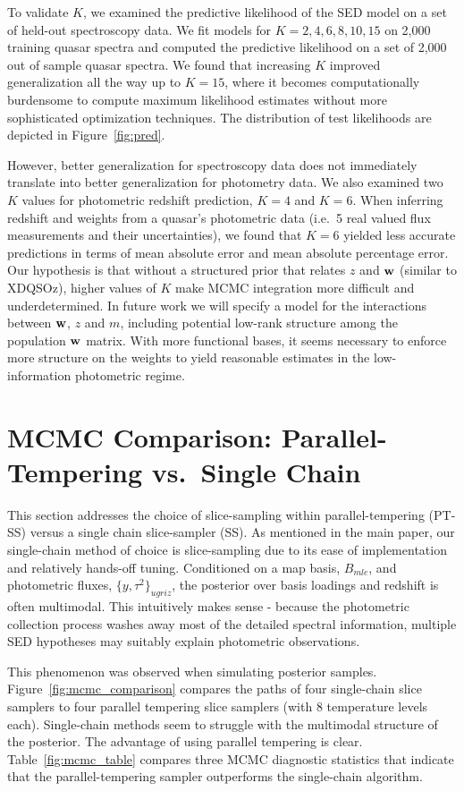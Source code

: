 \documentclass{article} %
\begin{document}
To validate $K$, we examined the predictive likelihood of the SED model on a set of held-out spectroscopy data.  We fit models for $K = 2, 4, 6, 8, 10, 15$ on 2,000 training quasar spectra and computed the predictive likelihood on a set of 2,000 out of sample quasar spectra.  We found that increasing $K$ improved generalization all the way up to $K = 15$, where it becomes computationally burdensome to compute maximum likelihood estimates without more sophisticated optimization techniques.  The distribution of test likelihoods are depicted in Figure~\ref{fig:pred}.  

However, better generalization for spectroscopy data does not immediately translate into better generalization for photometry data.  We also examined two $K$ values for photometric redshift prediction, $K=4$ and $K=6$.  When inferring redshift and weights from a quasar's photometric data (i.e.~5 real valued flux measurements and their uncertainties), we found that $K=6$ yielded less accurate predictions in terms of mean absolute error and mean absolute percentage error.  
Our hypothesis is that without a structured prior that relates $z$ and $\mathbf{w}$ (similar to XDQSOz), higher values of $K$ make MCMC integration more difficult and underdetermined.  In future work we will specify a model for the interactions between $\mathbf{w}$, $z$ and $m$, including potential low-rank structure among the population $\mathbf{w}$ matrix.  With more functional bases, it seems necessary to enforce more structure on the weights to yield reasonable estimates in the low-information photometric regime.  


\section{MCMC Comparison: Parallel-Tempering vs.~Single Chain}
This section addresses the choice of slice-sampling within parallel-tempering (PT-SS) versus a single chain slice-sampler (SS).  As mentioned in the main paper, our single-chain method of choice is slice-sampling due to its ease of implementation and relatively hands-off tuning. 
Conditioned on a map basis, $B_{mle}$, and photometric fluxes, $\{y, \tau^2\}_{ugriz}$, the posterior over basis loadings and redshift is often multimodal.  This intuitively makes sense - because the photometric collection process washes away most of the detailed spectral information, multiple SED hypotheses may suitably explain photometric observations. 

This phenomenon was observed when simulating posterior samples.  Figure~\ref{fig:mcmc_comparison} compares the paths of four single-chain slice samplers to four parallel tempering slice samplers (with 8 temperature levels each).  Single-chain methods seem to struggle with the multimodal structure of the posterior.  The advantage of using parallel tempering is clear.  Table~\ref{fig:mcmc_table} compares three MCMC diagnostic statistics that indicate that the parallel-tempering sampler outperforms the single-chain algorithm. 
\end{document}
